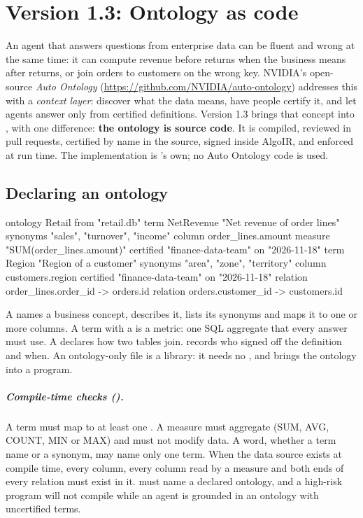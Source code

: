 \chapter{Version 1.3: Ontology as code}
\label{ch:v13}

An agent that answers questions from enterprise data can be fluent and wrong at the same time: it can compute revenue before returns when the business means after returns, or join orders to customers on the wrong key. NVIDIA's open-source \emph{Auto Ontology} (\url{https://github.com/NVIDIA/auto-ontology}) addresses this with a \emph{context layer}: discover what the data means, have people certify it, and let agents answer only from certified definitions. Version 1.3 brings that concept into \algolang{}, with one difference: \textbf{the ontology is source code}. It is compiled, reviewed in pull requests, certified by name in the source, signed inside AlgoIR, and enforced at run time. The implementation is \algolang{}'s own; no Auto Ontology code is used.

\section{Declaring an ontology}

\begin{algo}[title=examples/v13/retail.onto.algo (excerpt)]
ontology Retail from "retail.db" {
    term NetRevenue "Net revenue of order lines" {
        synonyms "sales", "turnover", "income"
        column order_lines.amount
        measure "SUM(order_lines.amount)"
        certified "finance-data-team" on "2026-11-18"
    }
    term Region "Region of a customer" {
        synonyms "area", "zone", "territory"
        column customers.region
        certified "finance-data-team" on "2026-11-18"
    }
    relation order_lines.order_id -> orders.id
    relation orders.customer_id -> customers.id
}
\end{algo}

A  names a business concept, describes it, lists its synonyms and maps it to one or more columns. A term with a  is a metric: one SQL aggregate that every answer must use. A  declares how two tables join.  records who signed off the definition and when. An ontology-only file is a library: it needs no , and  brings the ontology into a program.

\paragraph{Compile-time checks ().} A term must map to at least one . A measure must aggregate (SUM, AVG, COUNT, MIN or MAX) and must not modify data. A word, whether a term name or a synonym, may name only one term. When the data source exists at compile time, every column, every column read by a measure and both ends of every relation must exist in it.  must name a declared ontology, and a high-risk program will not compile while an agent is grounded in an ontology with uncertified terms.


